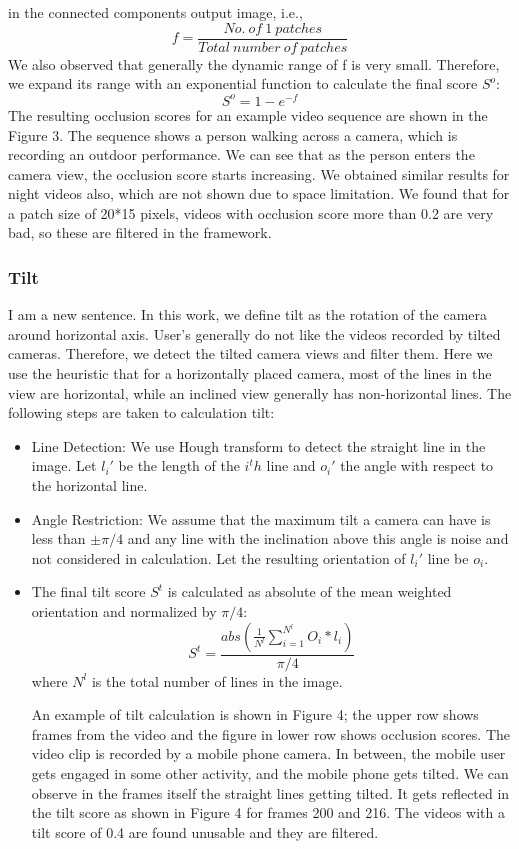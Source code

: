 \documentclass{sig-alternate}
\begin{document}
\begin{itemize}
in the connected components output image, i.e.,
\[f = \frac{No.\ of\ 1\ patches}{Total\ number\ of\ patches}\tag{4}\]
We also observed that generally the dynamic range of f is very
small. Therefore, we expand its range with an exponential function
to calculate the final score $S^o$:
\[S^o = 1 - e^ {-f}\tag{5}\]
The resulting occlusion scores for an example video sequence
are shown in the Figure 3. The sequence shows a person walking
across a camera, which is recording an outdoor performance. We
can see that as the person enters the camera view, the occlusion
score starts increasing. We obtained similar results for night videos
also, which are not shown due to space limitation. We found that
for a patch size of 20*15 pixels, videos with occlusion score more
than 0.2 are very bad, so these are filtered in the framework.
\end{itemize}

\subsubsection{Tilt}
I am a new sentence.
In this work, we define tilt as the rotation of the camera around
horizontal axis. User’s generally do not like the videos recorded
by tilted cameras. Therefore, we detect the tilted camera views
and filter them. Here we use the heuristic that for a horizontally
placed camera, most of the lines in the view are horizontal, while
an inclined view generally has non-horizontal lines. The following
steps are taken to calculation tilt:
\begin{itemize}
\item Line Detection: We use Hough transform to detect the straight
line in the image. Let $l_i'$ be the length of the $i^th$ line and $o_i'$
the angle with respect to the horizontal line.
\item Angle Restriction: We assume that the maximum tilt a camera can
have is less than $\pm \pi/4$
and any line with the inclination above this angle is
noise and not considered in calculation.
Let the resulting orientation of $l_i'$ line be $o_i$.
\item The final tilt score $S^t$ is calculated as absolute of the mean
weighted orientation and normalized by $\pi/4$:
\[S^t = \frac{abs\left ( \frac{1}{N^l}\sum_{i=1}^{N^l}O_i*l_i \right )}{\pi/4}\tag{6}\]
where $N^l$ is the total number of lines in the image.


An example of tilt calculation is shown in Figure 4; the upper
row shows frames from the video and the figure in lower row shows
occlusion scores. The video clip is recorded by a mobile phone
camera. In between, the mobile user gets engaged in some other
activity, and the mobile phone gets tilted. We can observe in the
frames itself the straight lines getting tilted. It gets reflected in the
tilt score as shown in Figure 4 for frames 200 and 216. The videos
with a tilt score of 0.4 are found unusable and they are filtered.
\end{itemize}
\end{document}
